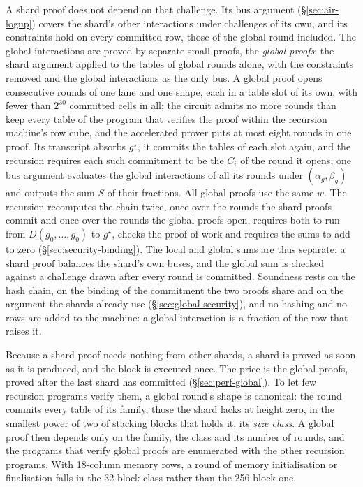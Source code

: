 A shard proof does not depend on that challenge. Its bus argument (\S\ref{sec:air-logup}) covers the shard's other interactions under challenges of its own, and its constraints hold on every committed row, those of the global round included. The global interactions are proved by separate small proofs, the \emph{global proofs}: the shard argument applied to the tables of global rounds alone, with the constraints removed and the global interactions as the only bus. A global proof opens consecutive rounds of one lane and one shape, each in a table slot of its own, with fewer than $2^{30}$ committed cells in all; the circuit admits no more rounds than keep every table of the program that verifies the proof within the recursion machine's row cube, and the accelerated prover puts at most eight rounds in one proof. Its transcript absorbs $g^\star$, it commits the tables of each slot again, and the recursion requires each such commitment to be the $C_i$ of the round it opens; one bus argument evaluates the global interactions of all its rounds under $(\alpha_g, \beta_g)$ and outputs the sum $S$ of their fractions. All global proofs use the same $w$. The recursion recomputes the chain twice, once over the rounds the shard proofs commit and once over the rounds the global proofs open, requires both to run from $D(g_0, \ldots, g_0)$ to $g^\star$, checks the proof of work and requires the sums to add to zero (\S\ref{sec:security-binding}). The local and global sums are thus separate: a shard proof balances the shard's own buses, and the global sum is checked against a challenge drawn after every round is committed. Soundness rests on the hash chain, on the binding of the commitment the two proofs share and on the \LogUp{} argument the shards already use (\S\ref{sec:global-security}), and no hashing and no rows are added to the machine: a global interaction is a fraction of the row that raises it.

Because a shard proof needs nothing from other shards, a shard is proved as soon as it is produced, and the block is executed once. The price is the global proofs, proved after the last shard has committed (\S\ref{sec:perf-global}). To let few recursion programs verify them, a global round's shape is canonical: the round commits every table of its family, those the shard lacks at height zero, in the smallest power of two of stacking blocks that holds it, its \emph{size class}. A global proof then depends only on the family, the class and its number of rounds, and the programs that verify global proofs are enumerated with the other recursion programs. With 18-column memory rows, a round of memory initialisation or finalisation falls in the 32-block class rather than the 256-block one.

